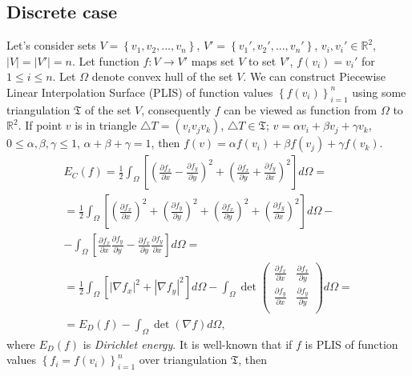 \documentclass{article}
\begin{document}
\subsection{Discrete case}
\label{sec:discrete}
Let's consider sets $V = \left\{v_1, v_2, ... , v_n\right\}$, $V' = \left\{v_1', v_2', ... , v_n'\right\}$, $v_i, v_i' \in \mathbb{R}^2$, $|V| = |V'| = n$. Let function $f: V \to V'$ maps set $V$ to set $V'$, 
$f(v_i) = v_i'$ for $1 \le i \le n$. Let $\Omega$ denote convex hull of the set $V$. We can construct Piecewise Linear Interpolation Surface (PLIS) of function values $\left\{f(v_i)\right\}_{i=1}^n$ 
using some triangulation $\mathfrak{T}$ of the set $V$, consequently $f$ can be viewed as function from $\Omega$ to~$\mathbb{R}^2$. If point $v$ is in triangle $\triangle T = (v_i v_j v_k)$, $\triangle T \in \mathfrak{T}$; 
$v = \alpha v_i + \beta v_j + \gamma v_k$, $0 \le \alpha, \beta, \gamma \le 1$, $\alpha + \beta + \gamma = 1$, then $f(v) = \alpha f(v_i) + \beta f(v_j) + \gamma f(v_k)$.
\begin{multline}
\label{formula:EC}
  E_C(f) =
  \frac{1}{2} \int_{\Omega}\left[{\left(\frac{\partial f_x}{\partial x} - \frac{\partial f_y}{\partial y}\right)^2 + \left(\frac{\partial f_x}{\partial y} + \frac{\partial f_y}{\partial x}\right)^2}\right] d\Omega = \\
  = \frac{1}{2} \int_{\Omega}\left[\left(\frac{\partial f_x}{\partial x}\right)^2 + \left(\frac{\partial f_y}{\partial y}\right)^2 + \left(\frac{\partial f_x}{\partial y}\right)^2 + 
  \left(\frac{\partial f_y}{\partial x}\right)^2 \right] d\Omega - \\
  - \int_{\Omega}\left[\frac{\partial f_x}{\partial x} \frac{\partial f_y}{\partial y} - \frac{\partial f_x}{\partial y} \frac{\partial f_y}{\partial x}\right] d\Omega = \\
  = \frac{1}{2} \int_{\Omega} \left[ \left| \nabla f_x \right| ^ 2 + \left| \nabla f_y \right| ^ 2 \right] d\Omega - \int_{\Omega} \det {\begin{pmatrix} 
    \frac{\partial f_x}{\partial x} & \frac{\partial f_x}{\partial y} \\
    \frac{\partial f_y}{\partial x} & \frac{\partial f_y}{\partial y} \\
  \end{pmatrix}} d\Omega = \\
  = E_D(f) - \int_{\Omega} \det (\nabla f) d\Omega,
\end{multline}
where $E_D(f)$ is \textit{Dirichlet energy}. It is well-known \cite{Pinkall93} that if $f$ is PLIS of function values $\left\{f_i = f(v_i)\right\}_{i=1}^n$ over triangulation $\mathfrak{T}$, then  
\end{document}

